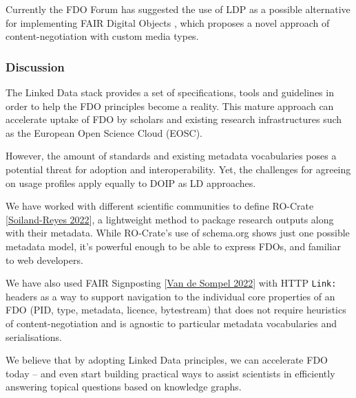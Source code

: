 Currently the FDO Forum has suggested the use of LDP as a possible
alternative for implementing FAIR Digital Objects \cite{bonino2021}, which
proposes a novel approach of content-negotiation with custom media
types.

\subsubsection{Discussion}\label{ch2>discussion}

The Linked Data stack provides a set of specifications, tools and
guidelines in order to help the FDO principles become a reality. This
mature approach can accelerate uptake of FDO by scholars and existing
research infrastructures such as the European Open Science Cloud (EOSC).

However, the amount of standards and existing metadata vocabularies
poses a potential threat for adoption and interoperability. Yet, the
challenges for agreeing on usage profiles apply equally to DOIP as LD
approaches.

We have worked with different scientific communities to define RO-Crate
{[}\href{https://doi.org/10.3233/DS-210053}{Soiland-Reyes 2022}{]}, a
lightweight method to package research outputs along with their
metadata. While RO-Crate's use of schema.org shows just one possible
metadata model, it's powerful enough to be able to express FDOs, and
familiar to web developers.

We have also used FAIR Signposting
{[}\href{https://signposting.org/FAIR/}{Van de Sompel 2022}{]} with HTTP
\texttt{Link:} headers as a way to support navigation to the individual
core properties of an FDO (PID, type, metadata, licence, bytestream)
that does not require heuristics of content-negotiation and is agnostic
to particular metadata vocabularies and serialisations.

We believe that by adopting Linked Data principles, we can accelerate
FDO today -- and even start building practical ways to assist scientists
in efficiently answering topical questions based on knowledge graphs.

